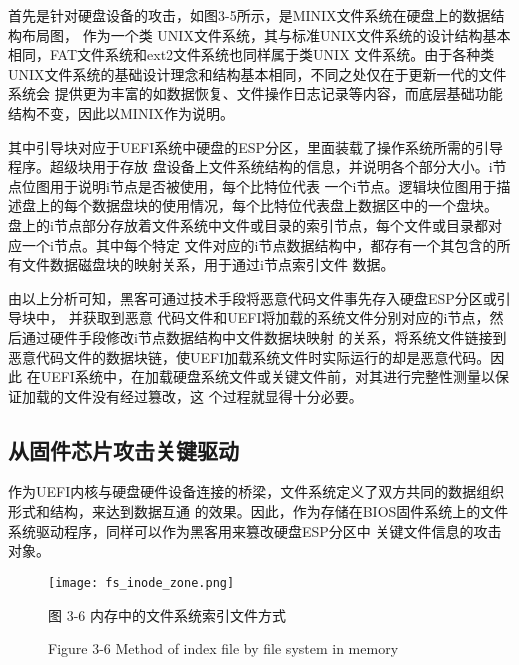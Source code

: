 \par 首先是针对硬盘设备的攻击，如图3-5所示，是MINIX文件系统在硬盘上的数据结构布局图\cite{chinese30}，
作为一个类
UNIX文件系统，其与标准UNIX文件系统的设计结构基本相同，FAT文件系统和ext2文件系统也同样属于类UNIX
文件系统。由于各种类UNIX文件系统的基础设计理念和结构基本相同，不同之处仅在于更新一代的文件系统会
提供更为丰富的如数据恢复、文件操作日志记录等内容，而底层基础功能结构不变，因此以MINIX作为说明\cite{chinese31}。
\par 其中引导块对应于UEFI系统中硬盘的ESP分区，里面装载了操作系统所需的引导程序。超级块用于存放
盘设备上文件系统结构的信息，并说明各个部分大小。i节点位图用于说明i节点是否被使用，每个比特位代表
一个i节点。逻辑块位图用于描述盘上的每个数据盘块的使用情况，每个比特位代表盘上数据区中的一个盘块。
盘上的i节点部分存放着文件系统中文件或目录的索引节点，每个文件或目录都对应一个i节点。其中每个特定
文件对应的i节点数据结构中，都存有一个其包含的所有文件数据磁盘块的映射关系，用于通过i节点索引文件
数据。
\par 由以上分析可知，黑客可通过技术手段将恶意代码文件事先存入硬盘ESP分区或引导块中\cite{chinese32}，
并获取到恶意
代码文件和UEFI将加载的系统文件分别对应的i节点，然后通过硬件手段修改i节点数据结构中文件数据块映射
的关系，将系统文件链接到恶意代码文件的数据块链，使UEFI加载系统文件时实际运行的却是恶意代码。因此
在UEFI系统中，在加载硬盘系统文件或关键文件前，对其进行完整性测量以保证加载的文件没有经过篡改，这
个过程就显得十分必要。

\subsection{从固件芯片攻击关键驱动}
作为UEFI内核与硬盘硬件设备连接的桥梁，文件系统定义了双方共同的数据组织形式和结构，来达到数据互通
的效果。因此，作为存储在BIOS固件系统上的文件系统驱动程序，同样可以作为黑客用来篡改硬盘ESP分区中
关键文件信息的攻击对象。

\begin{figure}[htb]
    \label{ffs_format}
    \vspace{0cm}   
    \setlength{\abovecaptionskip}{0.3cm}  
	\centering
    \texttt{[image: fs\_inode\_zone.png]}
    \caption*{图 3-6 内存中的文件系统索引文件方式}
    \setlength{\belowcaptionskip}{-0.7cm}
    \caption*{Figure 3-6 Method of index file by file system in memory}
\end{figure}

